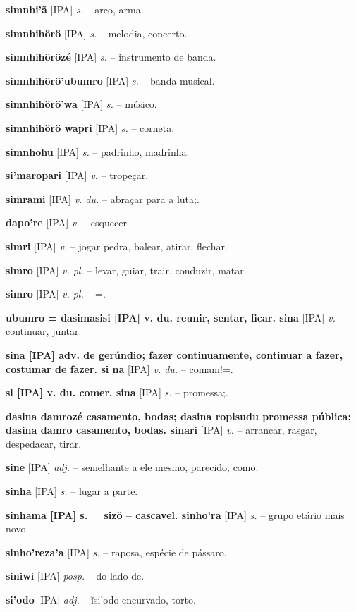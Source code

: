 {\textbf{simnhi'ã} [IPA] \textit{s.} -- arco, arma.

\textbf{simnhihörö} [IPA] \textit{s.} -- melodia, concerto.

\textbf{simnhihörözé} [IPA] \textit{s.} -- instrumento de banda.

\textbf{simnhihörö'ubumro} [IPA] \textit{s.} -- banda musical.

\textbf{simnhihörö'wa} [IPA] \textit{s.} -- músico.

\textbf{simnhihörö wapri} [IPA] \textit{s.} -- corneta.

\textbf{simnhohu} [IPA] \textit{s.} -- padrinho, madrinha.

\textbf{si'maropari} [IPA] \textit{v.} -- tropeçar.

\textbf{simrami} [IPA] \textit{v. du.} -- abraçar para a luta;.

\textbf{dapo're} [IPA] \textit{v.} -- esquecer.

\textbf{simri} [IPA] \textit{v.} -- jogar pedra, balear, atirar, flechar.

\textbf{simro} [IPA] \textit{v. pl.} -- levar, guiar, trair, conduzir, matar.

\textbf{simro} [IPA] \textit{v. pl.} -- =.

\textbf{ubumro = dasimasisi [IPA] v. du. reunir, sentar, ficar. sina} [IPA] \textit{v.} -- continuar, juntar.

\textbf{sina [IPA] adv. de gerúndio; fazer continuamente, continuar a fazer, costumar de fazer. si na} [IPA] \textit{v. du.} -- comam!=.

\textbf{si [IPA] v. du. comer. sina} [IPA] \textit{s.} -- promessa;.

\textbf{dasina damrozé casamento, bodas; dasina ropisudu promessa pública; dasina damro casamento, bodas. sinari} [IPA] \textit{v.} -- arrancar, rasgar, despedacar, tirar.

\textbf{sine} [IPA] \textit{adj.} -- semelhante a ele mesmo, parecido, como.

\textbf{sinha} [IPA] \textit{s.} -- lugar a parte.

\textbf{sinhama [IPA] s. = sizö -- cascavel. sinho'ra} [IPA] \textit{s.} -- grupo etário mais novo.

\textbf{sinho'reza'a} [IPA] \textit{s.} -- raposa, espécie de pássaro.

\textbf{siniwi} [IPA] \textit{posp.} -- do lado de.

\textbf{si'odo} [IPA] \textit{adj.} -- ĩsi'odo encurvado, torto.

}

